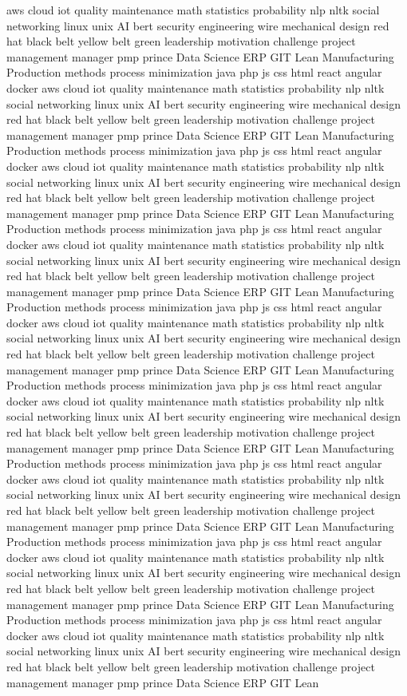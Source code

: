 \documentclass[letterpaper,11pt]{article}
\begin{document}
aws cloud iot quality maintenance math statistics probability nlp nltk social networking linux unix AI bert security engineering wire mechanical design red hat black belt yellow belt green leadership motivation challenge project management manager pmp prince Data Science ERP GIT Lean Manufacturing Production methods process minimization java php js css html react angular docker aws cloud iot quality maintenance math statistics probability nlp nltk social networking linux unix AI bert security engineering wire mechanical design red hat black belt yellow belt green leadership motivation challenge project management manager pmp prince Data Science ERP GIT Lean Manufacturing Production methods process minimization java php js css html react angular docker aws cloud iot quality maintenance math statistics probability nlp nltk social networking linux unix AI bert security engineering wire mechanical design red hat black belt yellow belt green leadership motivation challenge project management manager pmp prince Data Science ERP GIT Lean Manufacturing Production methods process minimization java php js css html react angular docker aws cloud iot quality maintenance math statistics probability nlp nltk social networking linux unix AI bert security engineering wire mechanical design red hat black belt yellow belt green leadership motivation challenge project management manager pmp prince Data Science ERP GIT Lean Manufacturing Production methods process minimization java php js css html react angular docker aws cloud iot quality maintenance math statistics probability nlp nltk social networking linux unix AI bert security engineering wire mechanical design red hat black belt yellow belt green leadership motivation challenge project management manager pmp prince Data Science ERP GIT Lean Manufacturing Production methods process minimization java php js css html react angular docker aws cloud iot quality maintenance math statistics probability nlp nltk social networking linux unix AI bert security engineering wire mechanical design red hat black belt yellow belt green leadership motivation challenge project management manager pmp prince Data Science ERP GIT Lean Manufacturing Production methods process minimization java php js css html react angular docker aws cloud iot quality maintenance math statistics probability nlp nltk social networking linux unix AI bert security engineering wire mechanical design red hat black belt yellow belt green leadership motivation challenge project management manager pmp prince Data Science ERP GIT Lean Manufacturing Production methods process minimization java php js css html react angular docker aws cloud iot quality maintenance math statistics probability nlp nltk social networking linux unix AI bert security engineering wire mechanical design red hat black belt yellow belt green leadership motivation challenge project management manager pmp prince Data Science ERP GIT Lean Manufacturing Production methods process minimization java php js css html react angular docker aws cloud iot quality maintenance math statistics probability nlp nltk social networking linux unix AI bert security engineering wire mechanical design red hat black belt yellow belt green leadership motivation challenge project management manager pmp prince Data Science ERP GIT Lean 
\end{document}
